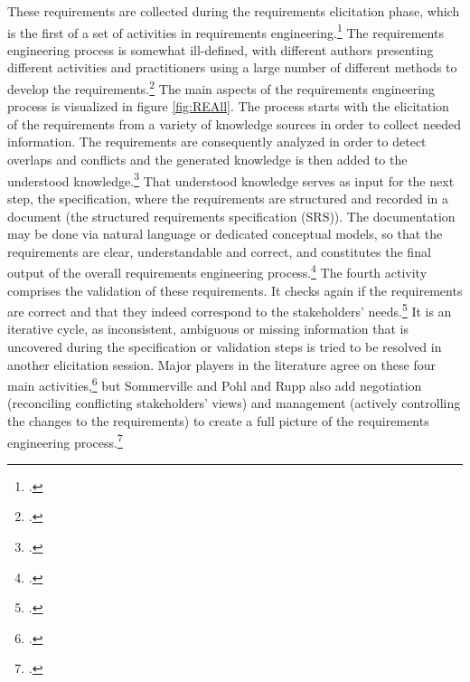 These requirements are collected during the requirements elicitation phase, which is the first of a set of activities in requirements engineering.\footcites[Cf.][p.116]{SommervilleSoftwareengineering2011}[cf.][p.17]{SommervilleIntegratedrequirementsengineering2005} The requirements engineering process is somewhat ill-defined, with different authors presenting different activities and practitioners using a large number of different methods to develop the requirements.\footcite[Cf.][p.225]{ZhangEffectiverequirementsdevelopmentA2007} The main aspects of the requirements engineering process is visualized in figure \ref{fig:REAll}. The process starts with the elicitation of the requirements from a variety of knowledge sources in order to collect needed information. The requirements are consequently analyzed in order to detect overlaps and conflicts and the generated knowledge is then added to the understood knowledge.\footcite[Cf.][p.17]{SommervilleIntegratedrequirementsengineering2005} That understood knowledge serves as input for the next step, the specification, where the requirements are structured and recorded in a document (the structured requirements specification (SRS)). The documentation may be done via natural language or dedicated conceptual models, so that the requirements are clear, understandable and correct, and constitutes the final output of the overall requirements engineering process.\footcites[Cf.][p.17]{SommervilleIntegratedrequirementsengineering2005}[chapter 1]{PohlRequirementsengineeringfundamentals2011} The fourth activity comprises the validation of these requirements. It checks again if the requirements are correct and that they indeed correspond to the stakeholders' needs.\footcite[Cf.][p.17]{SommervilleIntegratedrequirementsengineering2005}
It is an iterative cycle, as inconsistent, ambiguous or missing information that is uncovered during the specification or validation steps is tried to be resolved in another elicitation session. 
Major players in the literature agree on these four main activities,\footcites[Cf.][p.225]{ZhangEffectiverequirementsdevelopmentA2007}[cf.][p.220]{DavisSoftwarerequirementsobjects1993}[cf.][chapter 1]{PohlRequirementsengineeringfundamentals2011}[cf.][p.116]{SommervilleSoftwareengineering2011} but Sommerville and Pohl and Rupp also add negotiation (reconciling conflicting stakeholders' views) and management (actively controlling the changes to the requirements) to create a full picture of the requirements engineering process.\footcites[Cf.][p.17]{SommervilleSoftwareengineering2011}[cf.][chapter 1]{PohlRequirementsengineeringfundamentals2011}


